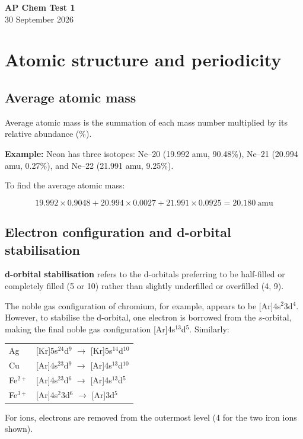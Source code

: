 \documentclass[a4paper, 12pt]{article}
\newcommand{\lab}[1]{\: \text{#1}}
\begin{document}
\begin{center}
\textbf{{\Large AP Chem Test 1}} \\
30 September 2026
\end{center}

\section*{Atomic structure and periodicity}

\subsection*{Average atomic mass}

Average atomic mass is the summation of each mass number multiplied by its relative abundance (\%).

\textbf{Example:} Neon has three isotopes: Ne--20 (19.992 amu, 90.48\%), Ne--21 (20.994 amu, 0.27\%), and Ne--22 (21.991 amu, 9.25\%).

To find the average atomic mass:

$$19.992 \times 0.9048 + 20.994 \times 0.0027 + 21.991 \times 0.0925 = \boxed{20.180 \lab{amu}}$$

\subsection*{Electron configuration and d-orbital stabilisation}

\textbf{d-orbital stabilisation} refers to the d-orbitals preferring to be half-filled or completely filled (5 or 10) rather than slightly underfilled or overfilled (4, 9).

The noble gas configuration of chromium, for example, appears to be [Ar]4s$^2$3d$^4$. However, to stabilise the d-orbital, one electron is borrowed from the $s$-orbital, making the final noble gas configuration [Ar]4s$^13$d$^5$. Similarly:

\begin{table}[H]
\begin{tabular}{l l}
Ag & [Kr]5s$^24$d$^9$ $\to$ [Kr]5s$^14$d$^{10}$ \\
Cu & [Ar]4s$^23$d$^9$ $\to$ [Ar]4s$^13$d$^{10}$ \\
Fe$^{2+}$ & [Ar]4s$^23$d$^6$ $\to$ [Ar]4s$^13$d$^5$ \\
Fe$^{3+}$ & [Ar]4s$^2$3d$^6$ $\to$ [Ar]3d$^5$
\end{tabular}
\end{table}
For ions, electrons are removed from the outermost level (4 for the two iron ions shown).
\end{document}
